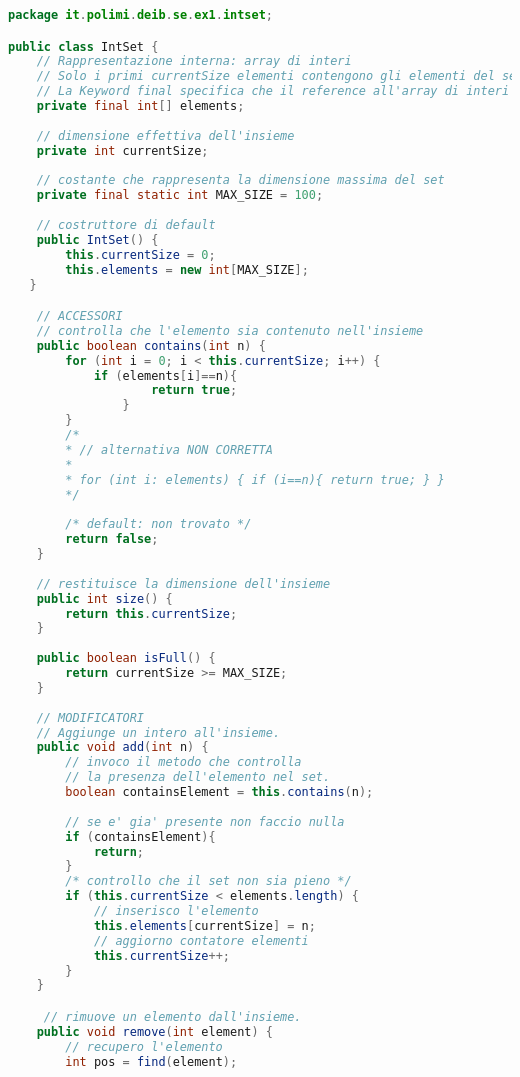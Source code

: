 \documentclass{article}
\begin{document}
\begin{lstlisting}[language=Java,escapechar=|]
package it.polimi.deib.se.ex1.intset;

public class IntSet {
    // Rappresentazione interna: array di interi
    // Solo i primi currentSize elementi contengono gli elementi del set
    // La Keyword final specifica che il reference all'array di interi non puo' cambiare durante l'esecuzione: una volta inizializzato l'array non e' possibile associare il reference elements a un nuovo array
    private final int[] elements;
    
    // dimensione effettiva dell'insieme
    private int currentSize;
    
    // costante che rappresenta la dimensione massima del set
    private final static int MAX_SIZE = 100;
    
    // costruttore di default
    public IntSet() {
        this.currentSize = 0;
        this.elements = new int[MAX_SIZE];
   }

    // ACCESSORI
    // controlla che l'elemento sia contenuto nell'insieme
    public boolean contains(int n) {
	    for (int i = 0; i < this.currentSize; i++) {
		    if (elements[i]==n){
		            return true;
                }
	    }
	    /*
	    * // alternativa NON CORRETTA
	    *
	    * for (int i: elements) { if (i==n){ return true; } }
	    */
	
	    /* default: non trovato */
	    return false;
    }
    
    // restituisce la dimensione dell'insieme
    public int size() {
        return this.currentSize;
    }
    
    public boolean isFull() {
        return currentSize >= MAX_SIZE;
    }
    
    // MODIFICATORI
    // Aggiunge un intero all'insieme.
    public void add(int n) {
        // invoco il metodo che controlla
        // la presenza dell'elemento nel set.
        boolean containsElement = this.contains(n);
        
        // se e' gia' presente non faccio nulla
        if (containsElement){
		    return;
    	}
    	/* controllo che il set non sia pieno */
    	if (this.currentSize < elements.length) {
    	    // inserisco l'elemento
    	    this.elements[currentSize] = n;
    	    // aggiorno contatore elementi
    	    this.currentSize++;
    	} 
    }

     // rimuove un elemento dall'insieme.
    public void remove(int element) {
        // recupero l'elemento
        int pos = find(element);
	

\end{lstlisting}
\end{document}
